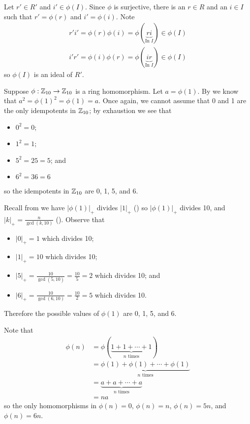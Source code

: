 \begin{questions}
\begin{partquestions}{\alph*}
        Let $r' \in R'$ and $i' \in \phi(I)$. Since $\phi$ is surjective, there is an $r \in R$ and an $i \in I$ such that $r' = \phi(r)$ and $i' = \phi(i)$. Note
        \begin{align*}
            r'i' = \phi(r)\phi(i) = \phi(\underbrace{ri}_{\text{In }I}) \in \phi(I)\\
            i'r' = \phi(i)\phi(r) = \phi(\underbrace{ir}_{\text{In }I}) \in \phi(I)
        \end{align*}
        so $\phi(I)$ is an ideal of $R'$.
    \end{partquestions}

    \item Suppose $\phi: \mathbb{Z}_{10}\to\mathbb{Z}_{10}$ is a ring homomorphism. Let $a = \phi(1)$. By  we know that $a^2 = \phi(1)^2 = \phi(1) = a$. Once again, we cannot assume that 0 and 1 are the only idempotents in $\mathbb{Z}_{10}$; by exhaustion we see that
    \begin{itemize}
        \item $0^2 = 0$;
        \item $1^2 = 1$;
        \item $5^2 = 25 = 5$; and
        \item $6^2 = 36 = 6$
    \end{itemize}
    so the idempotents in $\mathbb{Z}_{10}$ are 0, 1, 5, and 6.

    Recall from  we have $|\phi(1)|_+$ divides $|1|_+$ () so $|\phi(1)|_+$ divides 10, and $|k|_+ = \frac{n}{\gcd(k,10)}$ (). Observe that
    \begin{itemize}
        \item $|0|_+ = 1$ which divides 10;
        \item $|1|_+ = 10$ which divides 10;
        \item $|5|_+ = \frac{10}{\gcd(5,10)} = \frac{10}{5} = 2$ which divides 10; and
        \item $|6|_+ = \frac{10}{\gcd(6,10)} = \frac{10}{2} = 5$ which divides 10.
    \end{itemize}
    Therefore the possible values of $\phi(1)$ are 0, 1, 5, and 6.

    Note that
    \begin{align*}
        \phi(n) &= \phi(\underbrace{1+1+\cdots+1}_{n \text{ times}})\\
        &= \underbrace{\phi(1)+\phi(1)+\cdots+\phi(1)}_{n \text{ times}}\\
        &= \underbrace{a + a + \cdots + a}_{n \text{ times}}\\
        &= na
    \end{align*}
    so the only homomorphisms in $\phi(n) = 0$, $\phi(n) = n$, $\phi(n) = 5n$, and $\phi(n) = 6n$.


\end{questions}
